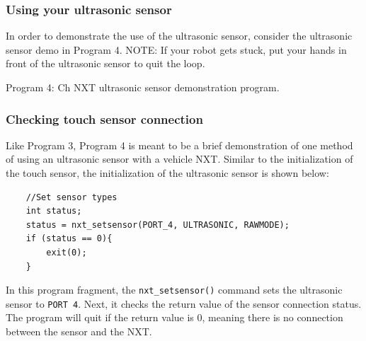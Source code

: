 \documentclass[12pt]{article}
\begin{document}
\subsubsection{Using your ultrasonic sensor}
In order to demonstrate the use of the ultrasonic sensor, consider the ultrasonic sensor demo in Program 4.
NOTE: If your robot gets stuck, put your hands in front of the ultrasonic sensor to quit the loop.


\begin{center}
Program 4: Ch NXT ultrasonic sensor demonstration program.
\end{center}
\subsubsection*{Checking touch sensor connection}
Like Program 3, Program 4 is meant to be a brief demonstration of one method of using an ultrasonic sensor 
with a vehicle NXT.
Similar to the initialization of the touch sensor, the initialization of the ultrasonic sensor is shown below:

\begin{verbatim}
    //Set sensor types
    int status;
    status = nxt_setsensor(PORT_4, ULTRASONIC, RAWMODE);
    if (status == 0){
        exit(0);
    }
\end{verbatim}
In this program fragment, the \verb+nxt_setsensor()+ command sets the ultrasonic sensor to \verb+PORT 4+.
Next, it checks the return value of the sensor connection status.
The program will quit if the return value is 0, meaning there is no connection between the sensor and the NXT.
\end{document}
